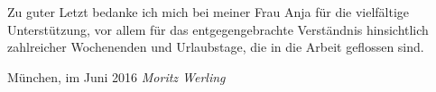 Zu guter Letzt bedanke ich mich bei meiner Frau Anja für die vielfältige Unterstützung, vor allem für das entgegengebrachte Verständnis hinsichtlich zahlreicher Wochenenden und Urlaubstage, die in die Arbeit geflossen sind. \\

\hspace{.5cm}

\noindent München, im Juni 2016 \hfill \textit{Moritz Werling}

